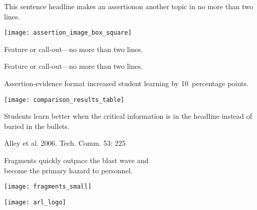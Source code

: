 \documentclass[t]{beamer}
\begin{document}
\begin{frame}[t]{This sentence headline makes an assertion\newline on another topic in no more than two lines.}

\begin{multicols}{2}
\begin{center}
\texttt{[image: assertion\_image\_box\_square]}
\end{center}

\columnbreak

Feature or call-out—no more than two lines.

\vspace{8\baselineskip}

Feature or call-out—no more than two lines.

\end{multicols}


\end{frame}

%

\begin{frame}{Assertion-evidence format increased student learning by 10~percentage points.}

\begin{multicols}{2}
\texttt{[image: comparison\_results\_table]}

\columnbreak


Students learn better when the critical information is in the headline instead of buried in the bullets.

\end{multicols}

\tinyfill Alley et al. 2006. Tech. Comm. 53: 225

\end{frame}

%

\begin{frame}[t]{Fragments quickly outpace the blast wave and\\become the primary hazard to personnel.}

\centering

\texttt{[image: fragments\_small]}

\vfilll

\hfill \texttt{[image: arl\_logo]}
\end{frame}
\end{document}
